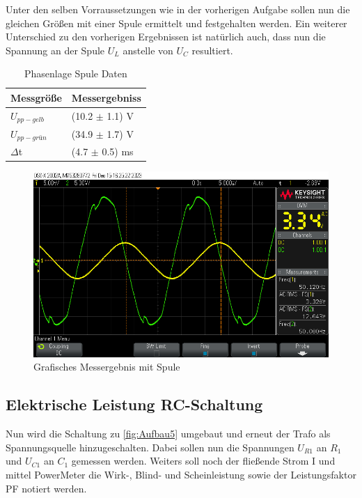 \documentclass[12pt,a4paper,twoside]{article}
\begin{document}
Unter den selben Vorraussetzungen wie in der vorherigen Aufgabe sollen nun die gleichen Größen mit einer Spule ermittelt und festgehalten werden.
Ein weiterer Unterschied zu den vorherigen Ergebnissen ist natürlich auch, dass nun die Spannung an der Spule $U_{L}$ anstelle von $U_{C}$ resultiert.

\begin{table}[H]
    \centering
    \caption{Phasenlage Spule Daten}
    \label{tab:Daten4}
    \begin{tabular}{| l | l |}
        \hline
        Messgröße & Messergebniss \\
        \hline
        $U_{pp-gelb}$ & (10.2 $\pm$ 1.1) V \\
        $U_{pp-grün}$ & (34.9 $\pm$ 1.7) V \\
        $\Delta$t & (4.7 $\pm$ 0.5) ms  \\
        \hline
    \end{tabular}
\end{table}


\begin{figure}[H]
    \centering
    \includegraphics[width=0.6\linewidth]{nudes/PhaseLeistung/Aufgabe4/scope_6.png}
    \caption{Grafisches Messergebnis mit Spule}
    \label{fig:MessergebnisGrafischSpule}
\end{figure}


\subsection{Elektrische Leistung RC-Schaltung}

Nun wird die Schaltung zu \ref{fig:Aufbau5} umgebaut und erneut der Trafo als Spannungsquelle hinzugeschalten. Dabei sollen nun die Spannungen $U_{R1}$ an $R_{1}$ und $U_{C1}$ an $C_{1}$ gemessen werden.
Weiters soll noch der fließende Strom I und mittel PowerMeter die Wirk-, Blind- und Scheinleistung sowie der Leistungsfaktor PF notiert werden.
\end{document}
